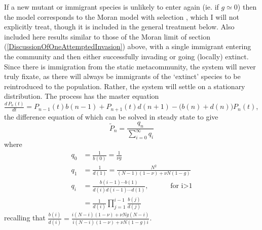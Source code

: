 If a new mutant or immigrant species is unlikely to enter again (ie. if $g\simeq 0$) then the model corresponds to the Moran model with selection \cite{???}, which I will not explicitly treat, though it is included in the general treatment below. %
Also included here results similar to those of the Moran limit of section (\ref{DiscussionOfOneAttemptedInvasion}) above, with a single immigrant entering the community and then either successfully invading or going (locally) extinct. 
Since there is immigration from the static metacommunity, the system will never truly fixate, as there will always be immigrants of the `extinct' species to be reintroduced to the population.  
Rather, the system will settle on a stationary distribution. 
The process has the master equation $\frac{d\,P_n(t)}{dt} = P_{n-1}(t)b(n-1) + P_{n+1}(t)d(n+1) - \big(b(n)+d(n)\big)P_n(t)$,
the difference equation of which can be solved in steady state to give
\begin{equation}
\widetilde{P}_n = \frac{q_n}{\sum_{i=0}^\infty q_i}
\end{equation}
where
\begin{align*}
 q_0 &= \frac{1}{b(0)} = \frac{1}{\nu g} \\
 q_1 &= \frac{1}{d(1)} = \frac{N^2}{(N-1)(1-\nu) + \nu N(1-g)} \\
 q_i &= \frac{b(i-1)\cdots b(1)}{d(i)d(i-1)\cdots d(1)}, \text{  }\hspace{1cm} \text{for i>1} \\
     &= \frac{1}{d(i)}\prod_{j=1}^{i-1}\frac{b(j)}{d(j)}
\end{align*}
recalling that $\frac{b(i)}{d(i)} = \frac{i(N-i)(1-\nu) + \nu Ng(N-i)}{i(N-i)(1-\nu) + \nu N(1-g)i}$.
